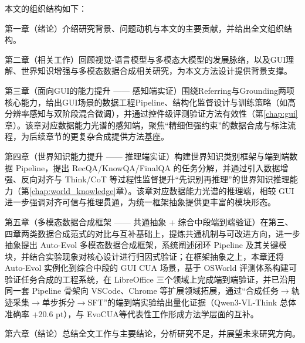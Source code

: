 本文的组织结构如下：

第一章（绪论）介绍研究背景、问题动机与本文的主要贡献，并给出全文组织结构。

第二章（相关工作）回顾视觉-语言模型与多模态大模型的发展脉络，以及GUI理解、世界知识增强与多模态数据合成相关研究，为本文方法设计提供背景支撑。

第三章（面向GUI的能力提升 —— 感知端实证）围绕Referring与Grounding两项核心能力，给出GUI场景的数据工程Pipeline、结构化监督设计与训练策略（如高分辨率感知与双阶段混合微调），并通过控件级评测验证方法有效性（第\ref{chap:gui}章）。该章对应数据能力光谱的感知端，聚焦“精细但强约束”的数据合成与标注流程，为后续章节的更复杂合成提供方法基座。

第四章（世界知识能力提升 —— 推理端实证）构建世界知识类别框架与端到端数据 Pipeline，提出 RecQA/\allowbreak KnowQA/\allowbreak FinalQA 的任务分解，并通过引入数据增强、反向对齐与 Think/CoT 等过程性监督提升“先识别再推理”的世界知识推理能力（第\ref{chap:world_knowledge}章）。该章对应数据能力光谱的推理端，相较 GUI 进一步强调对齐可信与推理贯通，为统一框架抽象提供更丰富的模块形态。

第五章（多模态数据合成框架 —— 共通抽象 + 综合中段端到端验证）在第三、四章两类数据合成范式的对比与互补基础上，提炼共通机制与可改进方向，进一步抽象提出 Auto-Evol 多模态数据合成框架，系统阐述闭环 Pipeline 及其关键模块，并结合实验现象对核心设计进行归因式验证；在框架抽象之上，本章还将 Auto-Evol 实例化到综合中段的 GUI CUA 场景，基于 OSWorld 评测体系\citep{xie2024osworld}构建可验证任务合成的工程系统，在 LibreOffice 三个领域上完成端到端验证，并已沿用同一套 Pipeline 骨架向 VSCode、Chrome 等扩展领域拓展，通过“合成任务$\rightarrow$轨迹采集$\rightarrow$单步拆分$\rightarrow$SFT”的端到端实验给出量化证据（Qwen3-VL-Think 总体准确率 +20.6 pt），与 EvoCUA\citep{xue2026evocua}等代表性工作形成方法学层面的互补。

第六章（结论）总结全文工作与主要结论，分析研究不足，并展望未来研究方向。

